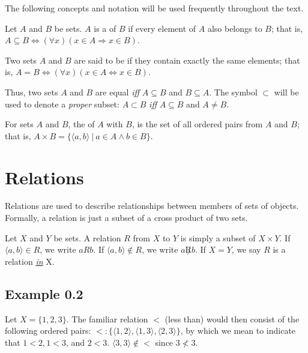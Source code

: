 The following concepts and notation will be used frequently throughout the text.

\begin{dfn}\label{dfn-0.2}
Let $A$ and $B$ be sets. $A$ is a \emph{} of $B$ if every element
of $A$ also belongs to $B$; that is, $A \subseteq B \Leftrightarrow (\forall x)
(x \in A \Rightarrow x \in B)$.
\end{dfn}

\begin{dfn}\label{dfn-0.3}
Two sets $A$ and $B$ are said to be \emph{} if they contain exactly
the same elements; that is, $A = B \Leftrightarrow (\forall x)(x \in A
\Leftrightarrow x \in B)$.
\end{dfn}

Thus, two sets $A$ and $B$ are equal \emph{iff} $A \subseteq B$ and $B \subseteq
A$. The symbol $\subset$ will be used to denote a \emph{proper} subset: 
$A \subset B$ \emph{iff} $A \subseteq B$ and $A \neq B$.

\begin{dfn}\label{dfn-0.4}
For sets $A$ and $B$, the \emph{} of $A$ with $B$, is the
set of all ordered pairs from $A$ and $B$; that is, 
$A \times B = \{\langle a, b\rangle \ |\  a \in A \wedge b \in B\}$.
\end{dfn}

\section{Relations}\label{sec-0.2}
Relations are used to describe relationships between members of sets of objects.
Formally, a relation is just a subset of a cross product of two sets.

\begin{dfn}\label{dfn-0.5}
Let $X$ and $Y$ be sets. A relation $R$ from $X$ to $Y$ is simply a
subset of $X \times Y$. If $\langle a,b\rangle \in R$, we write $aRb$. If
$\langle a,b\rangle\notin R$, we write $a$$\not  R b$. If $X = Y$, we say $R$ is
a relation \underline{\emph{in}} X.
\end{dfn}

\subsection*{Example 0.2}

Let $X = \{1,2,3\}$. The familiar relation $<$ (less than) would then consist of
the following ordered pairs:
$<: \{\langle 1, 2\rangle , \langle 1, 3\rangle , \langle 2, 3\rangle \}$,
by which we mean to indicate that $1 < 2, 1 < 3$, and $2 < 3$.
$\langle 3,3\rangle \not \in <$ since $3 \not< 3$.

